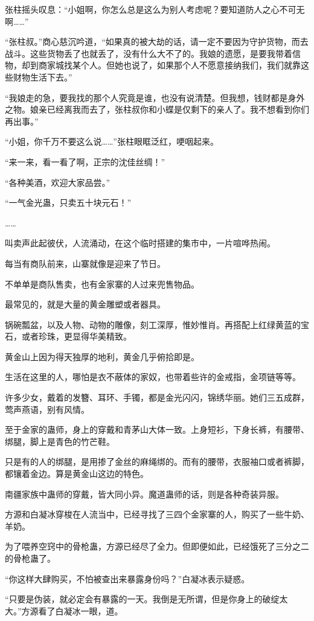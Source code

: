 \begin{this_body}
张柱摇头叹息：“小姐啊，你怎么总是这么为别人考虑呢？要知道防人之心不可无啊……”

“张柱叔。”商心慈沉吟道，“如果真的被大劫的话，请一定不要因为守护货物，而去战斗。这些货物丢了也就丢了，没有什么大不了的。我娘的遗愿，是要我带着信物，却到商家城找某个人。但她也说了，如果那个人不愿意接纳我们，我们就靠这些财物生活下去。”

“我娘走的急，要我找的那个人究竟是谁，也没有说清楚。但我想，钱财都是身外之物。娘亲已经离我而去了，张柱叔你和小蝶是仅剩下的亲人了。我不想看到你们再出事。”

“小姐，你千万不要这么说……”张柱眼眶泛红，哽咽起来。

“来一来，看一看了啊，正宗的沈佳丝绸！”

“各种美酒，欢迎大家品尝。”

“一气金光蛊，只卖五十块元石！”

……

叫卖声此起彼伏，人流涌动，在这个临时搭建的集市中，一片喧哗热闹。

每当有商队前来，山寨就像是迎来了节日。

不单单是商队售卖，也有金家寨的人过来兜售物品。

最常见的，就是大量的黄金雕塑或者器具。

锅碗瓢盆，以及人物、动物的雕像，刻工深厚，惟妙惟肖。再搭配上红绿黄蓝的宝石，或者珍珠，更显得华美精致。

黄金山上因为得天独厚的地利，黄金几乎俯拾即是。

生活在这里的人，哪怕是衣不蔽体的家奴，也带着些许的金戒指，金项链等等。

许多少女，戴着的发簪、耳环、手镯，都是金光闪闪，锦绣华丽。她们三五成群，莺声燕语，别有风情。

至于金家的蛊师，身上的穿戴和青茅山大体一致。上身短衫，下身长裤，有腰带、绑腿，脚上是青色的竹芒鞋。

只是有的人的绑腿，是用掺了金丝的麻绳绑的。而有的腰带，衣服袖口或者裤脚，都镶着金边。算是黄金山这边的特色。

南疆家族中蛊师的穿戴，皆大同小异。魔道蛊师的话，则是各种奇装异服。

方源和白凝冰穿梭在人流当中，已经寻找了三四个金家寨的人，购买了一些牛奶、羊奶。

为了喂养空窍中的骨枪蛊，方源已经尽了全力。但即便如此，已经饿死了三分之二的骨枪蛊了。

“你这样大肆购买，不怕被查出来暴露身份吗？”白凝冰表示疑惑。

“只要是伪装，就必定会有暴露的一天。我倒是无所谓，但是你身上的破绽太大。”方源看了白凝冰一眼，道。


\end{this_body}
